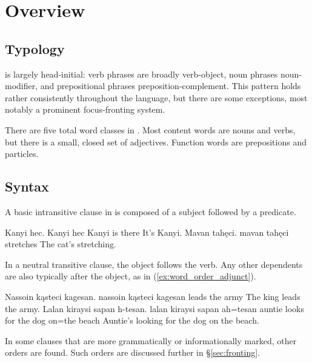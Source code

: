 \chapter{Overview}
\section{Typology}
\langname{} is largely head-initial: verb phrases are broadly verb-object, noun phrases noun-modifier, and prepositional phrases preposition-complement. This pattern holds rather consistently throughout the language, but there are some exceptions, most notably a prominent focus-fronting system.

There are five total word classes in \langname{}. Most content words are nouns and verbs, but there is a small, closed set of adjectives. Function words are prepositions and particles.

\section{Syntax}
A basic intransitive clause in \langname{} is composed of a subject followed by a predicate.  

\begin{examples}
    \ex
        \script Kanyi hec.
        \bits Kanyi hec
        \gloss Kanyi {is there}
        \tr It's Kanyi.
    \ex
        \script Mavan tahęci.
        \bits mavan tahęci
         stretches
        \tr The cat's stretching.
\end{examples}

In a neutral transitive clause, the object follows the verb. Any other dependents are also typically after the object, as in (\ref{ex:word_order_adjunct}).

\begin{examples}
    \ex
        \script Nassoin kąsteci kagesan.
        \bits nassoin kąsteci kagesan
         leads {the army}
        \tr The king leads the army.
    \ex \label{ex:word_order_adjunct}
        \script Lalan kiraysi sapan h-tesan.
        \bits lalan kiraysi sapan ah=tesan
        \gloss auntie {looks for} {the dog} on={the beach}
        \tr Auntie's looking for the dog on the beach.
\end{examples}

In some clauses that are more grammatically or informationally marked, other orders are found. Such orders are discussed further in §\ref{sec:fronting}.

